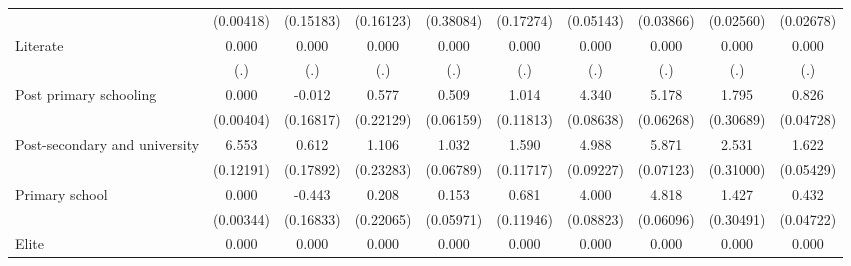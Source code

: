 {\begin{tabular}{l*{9}{c}}
                    &   (0.00418)         &   (0.15183)         &   (0.16123)         &   (0.38084)         &   (0.17274)         &   (0.05143)         &   (0.03866)         &   (0.02560)         &   (0.02678)         \\
Literate            &       0.000         &       0.000         &       0.000         &       0.000         &       0.000         &       0.000         &       0.000         &       0.000         &       0.000         \\
                    &         (.)         &         (.)         &         (.)         &         (.)         &         (.)         &         (.)         &         (.)         &         (.)         &         (.)         \\
Post primary schooling&       0.000         &      -0.012         &       0.577\sym{**} &       0.509\sym{***}&       1.014\sym{***}&       4.340\sym{***}&       5.178\sym{***}&       1.795\sym{***}&       0.826\sym{***}\\
                    &   (0.00404)         &   (0.16817)         &   (0.22129)         &   (0.06159)         &   (0.11813)         &   (0.08638)         &   (0.06268)         &   (0.30689)         &   (0.04728)         \\
Post-secondary and university&       6.553\sym{***}&       0.612\sym{***}&       1.106\sym{***}&       1.032\sym{***}&       1.590\sym{***}&       4.988\sym{***}&       5.871\sym{***}&       2.531\sym{***}&       1.622\sym{***}\\
                    &   (0.12191)         &   (0.17892)         &   (0.23283)         &   (0.06789)         &   (0.11717)         &   (0.09227)         &   (0.07123)         &   (0.31000)         &   (0.05429)         \\
Primary school      &       0.000         &      -0.443\sym{**} &       0.208         &       0.153\sym{*}  &       0.681\sym{***}&       4.000\sym{***}&       4.818\sym{***}&       1.427\sym{***}&       0.432\sym{***}\\
                    &   (0.00344)         &   (0.16833)         &   (0.22065)         &   (0.05971)         &   (0.11946)         &   (0.08823)         &   (0.06096)         &   (0.30491)         &   (0.04722)         \\
Elite               &       0.000         &       0.000         &       0.000         &       0.000         &       0.000         &       0.000         &       0.000         &       0.000         &       0.000         \\

\end{tabular}}
